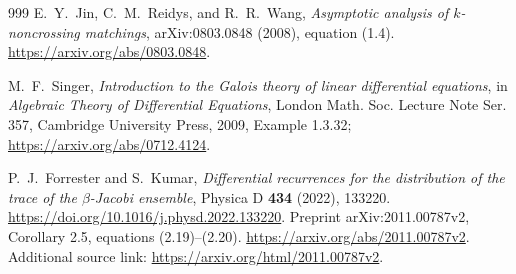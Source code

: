 \documentclass[11pt,a4paper]{article}
\theoremstyle{definition}
\theoremstyle{remark}
\numberwithin{equation}{section}
\begin{document}
\begin{thebibliography}{999}
E.~Y.~Jin, C.~M.~Reidys, and R.~R.~Wang,
\emph{Asymptotic analysis of $k$-noncrossing matchings},
arXiv:0803.0848 (2008), equation (1.4).
\url{https://arxiv.org/abs/0803.0848}.

M.~F.~Singer,
\emph{Introduction to the Galois theory of linear differential equations},
in \emph{Algebraic Theory of Differential Equations},
London Math. Soc. Lecture Note Ser. 357, Cambridge University Press,
2009, Example 1.3.32; \url{https://arxiv.org/abs/0712.4124}.

P.~J.~Forrester and S.~Kumar,
\emph{Differential recurrences for the distribution of the trace of the
$\beta$-Jacobi ensemble},
Physica D \textbf{434} (2022), 133220.
\url{https://doi.org/10.1016/j.physd.2022.133220}.
Preprint arXiv:2011.00787v2, Corollary 2.5,
equations (2.19)--(2.20).
\url{https://arxiv.org/abs/2011.00787v2}.
Additional source link: \url{https://arxiv.org/html/2011.00787v2}.
\end{thebibliography}
\end{document}

